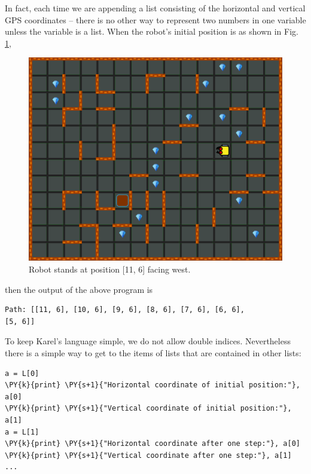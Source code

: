 \noindent
In fact, each time we are appending a list consisting of the horizontal and 
vertical GPS coordinates -- there is no other way to represent two numbers 
in one variable unless the variable is a list. When the robot's initial position 
is as shown in Fig. \ref{fig:list-1},


\begin{figure}[!ht]
\begin{center}
\includegraphics[height=0.4\textwidth]{img/lists-1.png}
\vspace{-0mm}
\caption{Robot stands at position [11, 6] facing west.}
\label{fig:list-1}
\end{center}
\end{figure}

\noindent
then the output of the above program is\\

\begin{ybox}
\begin{Verbatim}[commandchars=\\\{\}]
Path: [[11, 6], [10, 6], [9, 6], [8, 6], [7, 6], [6, 6], 
[5, 6]]
\end{Verbatim}
\end{ybox}
\vspace{6mm}

\noindent
To keep Karel's language simple, we do not allow double indices. Nevertheless
there is a simple way to get to the items of lists that are contained in other lists:\\

\begin{bbox}
\begin{Verbatim}[commandchars=\\\{\}]
a = L[0]
\PY{k}{print} \PY{s+1}{"Horizontal coordinate of initial position:"}, a[0]
\PY{k}{print} \PY{s+1}{"Vertical coordinate of initial position:"}, a[1]
a = L[1]
\PY{k}{print} \PY{s+1}{"Horizontal coordinate after one step:"}, a[0]
\PY{k}{print} \PY{s+1}{"Vertical coordinate after one step:"}, a[1]
...
\end{Verbatim}
\end{bbox}

